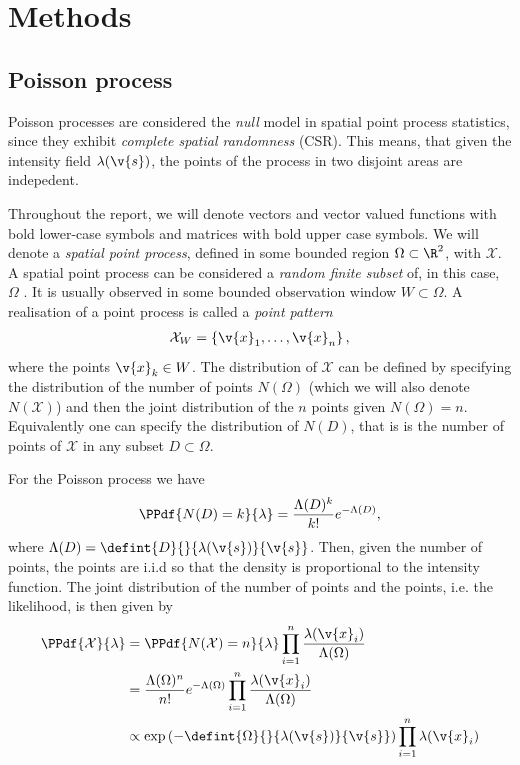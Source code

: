 \documentclass[12pt,a4paper,oneside,article]{memoir}
\begin{document}
\section{Methods}


\subsection{Poisson process}

Poisson processes are considered the \emph{null} model in spatial 
point process statistics, since they exhibit \emph{complete spatial randomness} (CSR).
This means, that given the intensity field $\lambda(\v{s})$, the points of the process 
in two disjoint areas are indepedent.

Throughout the report, we will denote  vectors and vector valued functions with bold lower-case symbols and matrices
with bold upper case symbols. We will denote a \emph{spatial point process}, defined in some bounded region
$\Omega\subset\R^2$, with $\mathcal{X}$. A spatial point process can be considered a 
\emph{random finite subset} of, in this case, $\Omega$ \cite{Moller2007}. It is usually observed
in some bounded observation window $W\subset\Omega$.
A realisation of a point process is called a \emph{point pattern}
\begin{align}
	\mathcal{X}_W=\left\{\v{x}_1,\dots,\v{x}_n\right\},
	\label{eq:point_pattern}
\end{align}
where the points $\v{x}_k\in W$. 
The distribution of $\mathcal{X}$ can be defined by specifying the distribution of
the number of points $N(\Omega)$ (which we will also denote $N(\mathcal{X})$) and then the joint distribution of the $n$
points given $N(\Omega)=n$. Equivalently one can specify the distribution of $N(D)$, that is
is the number of points of $\mathcal{X}$ in any subset $D\subset \Omega$.

For the Poisson process we have
\begin{align}
	\PPdf{N(D)=k}{\lambda}=\frac{\Lambda(D)^k}{k!}e^{-\Lambda(D)},
	\label{eq:poisson}
\end{align}
where $\Lambda(D)=\defint{D}{}{\lambda(\v{s})}{\v{s}}$. Then, given the number of points,
the points are i.i.d so that the density is proportional to the intensity function. The joint distribution
of the number of points and the points, i.e. the likelihood, is then given by
\begin{align}
	\PPdf{\mathcal{X}}{\lambda}&=\PPdf{N(\mathcal{X})=n}{\lambda}\prod_{i=1}^n\frac{\lambda(\v{x}_i)}{\Lambda(\Omega)}
	\nonumber\\
	&=\frac{\Lambda(\Omega)^n}{n!}e^{-\Lambda(\Omega)}\prod_{i=1}^n\frac{\lambda(\v{x}_i)}{\Lambda(\Omega)} \nonumber\\
	&\propto \exp\left( -\defint{\Omega}{}{\lambda(\v{s})}{\v{s}} \right)\prod_{i=1}^n \lambda(\v{x}_i)
	\label{eq:poisson_lh}
\end{align}
\end{document}
